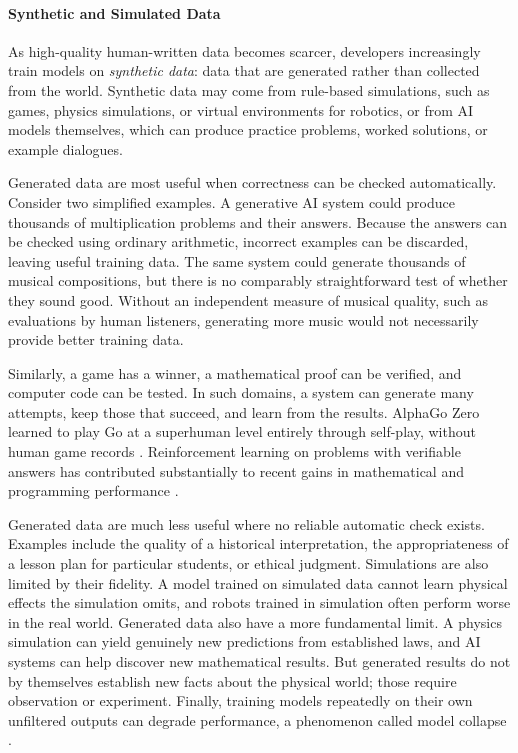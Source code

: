 \documentclass[11pt]{article}
\begin{document}
\paragraph{Synthetic and Simulated Data}

As high-quality human-written data becomes scarcer, developers increasingly train models on \emph{synthetic data}: data that are generated rather than collected from the world. Synthetic data may come from rule-based simulations, such as games, physics simulations, or virtual environments for robotics, or from AI models themselves, which can produce practice problems, worked solutions, or example dialogues.

Generated data are most useful when correctness can be checked automatically.
Consider two simplified examples. A generative AI system could produce thousands of multiplication problems and their answers. Because the answers can be checked using ordinary arithmetic, incorrect examples can be discarded, leaving useful training data. The same system could generate thousands of musical compositions, but there is no comparably straightforward test of whether they sound good. Without an independent measure of musical quality, such as evaluations by human listeners, generating more music would not necessarily provide better training data.

Similarly, a game has a winner, a mathematical proof can be verified, and computer code can be tested. In such domains, a system can generate many attempts, keep those that succeed, and learn from the results. AlphaGo Zero learned to play Go at a superhuman level entirely through self-play, without human game records \citep{Silver2017AlphaGoZero}. Reinforcement learning on problems with verifiable answers has contributed substantially to recent gains in mathematical and programming performance \citep{Guo2025DeepSeekR1}.

Generated data are much less useful where no reliable automatic check exists. Examples include the quality of a historical interpretation, the appropriateness of a lesson plan for particular students, or ethical judgment. Simulations are also limited by their fidelity. A model trained on simulated data cannot learn physical effects the simulation omits, and robots trained in simulation often perform worse in the real world. Generated data also have a more fundamental limit. A physics simulation can yield genuinely new predictions from established laws, and AI systems can help discover new mathematical results. But generated results do not by themselves establish new facts about the physical world; those require observation or experiment. Finally, training models repeatedly on their own unfiltered outputs can degrade performance, a phenomenon called model collapse \citep{Shumailov2024Collapse}.
\end{document}
